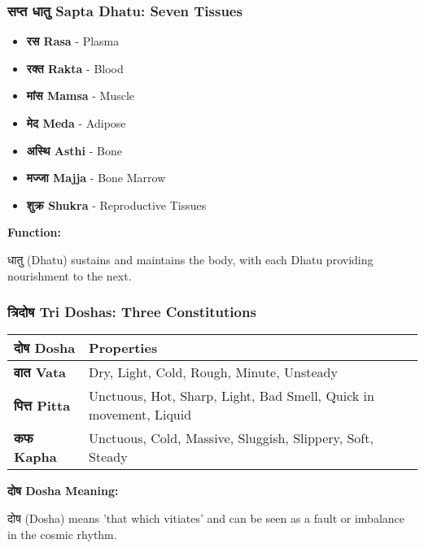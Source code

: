 \begin{frame}[fragile]\frametitle{सप्त धातु  Sapta Dhatu: Seven Tissues}
    \begin{itemize}
        \item \textbf{रस  Rasa} - Plasma
        \item \textbf{रक्त  Rakta} - Blood
        \item \textbf{मांस  Mamsa} - Muscle
        \item \textbf{मेद  Meda} - Adipose
        \item \textbf{अस्थि Asthi} - Bone
        \item \textbf{मज्जा Majja} - Bone Marrow
        \item \textbf{शुक्र Shukra} - Reproductive Tissues
    \end{itemize}
    \vspace{0.5cm}
    \textbf{Function:} 
    
    धातु (Dhatu) sustains and maintains the body, with each Dhatu providing nourishment to the next.
    
\end{frame}

\begin{frame}[fragile]\frametitle{त्रिदोष  Tri Doshas: Three Constitutions}
    \begin{tabular}{|l|l|}
    \hline
    \textbf{दोष Dosha} & \textbf{Properties} \\
    \hline
    \textbf{वात  Vata} & Dry, Light, Cold, Rough, Minute, Unsteady \\
    \hline
    \textbf{पित्त Pitta} & Unctuous, Hot, Sharp, Light, Bad Smell, Quick in movement, Liquid \\
    \hline
    \textbf{कफ  Kapha} & Unctuous, Cold, Massive, Sluggish, Slippery, Soft, Steady \\
    \hline
    \end{tabular}
    \vspace{0.5cm}
    \textbf{दोष Dosha Meaning:}
    
    दोष (Dosha) means 'that which vitiates' and can be seen as a fault or imbalance in the cosmic rhythm.
    
\end{frame}

